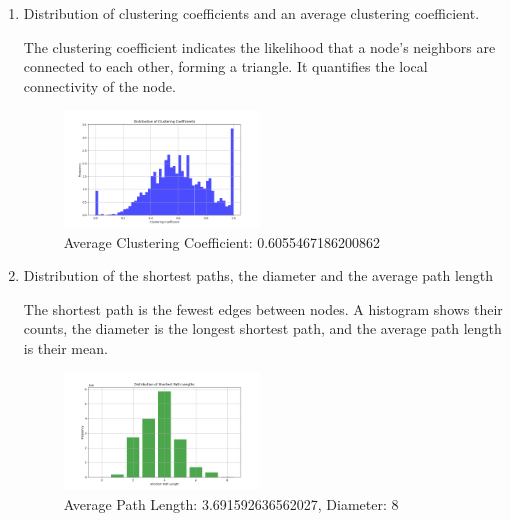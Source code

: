 \documentclass[10pt,letterpaper, onecolumn]{report}
\begin{document}
\begin{flushleft}
\begin{enumerate}[label=(\alph*)]
        \item Distribution of clustering coefficients and an average clustering coefficient.
        
        The clustering coefficient indicates the likelihood that a node's neighbors are connected to each other, forming a triangle. It quantifies the local connectivity of the node.

        \begin{figure}[htbp!] %
            \centering
            \includegraphics[width=0.49\textwidth]{../clustering_distribution.png} %
            \caption{Average Clustering Coefficient: 0.6055467186200862} %
        \end{figure}

        \item Distribution of the shortest paths, the diameter and the average path length

        The shortest path is the fewest edges between nodes. A histogram shows their counts, the diameter is the longest shortest path, and the average path length is their mean.
        \begin{figure}[htbp!] %
            \centering
            \includegraphics[width=0.49\textwidth]{../path_length_distribution.png} %
            \caption{Average Path Length: 3.691592636562027, Diameter: 8} %
        \end{figure}

    \end{enumerate}

\end{flushleft}
\end{document}
